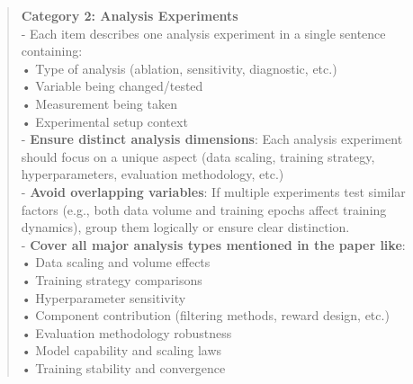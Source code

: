 \begin{quote}
\begin{tcolorbox}[breakable,colback=extraction!20!white, colframe=extraction!60!black, title=\textbf{Prompt for Extraction Agent}]
        \textbf{Category 2: Analysis Experiments}\\
        - Each item describes one analysis experiment in a single sentence containing:\\
        • Type of analysis (ablation, sensitivity, diagnostic, etc.)\\
        • Variable being changed/tested\\
        • Measurement being taken\\
        • Experimental setup context\\
        - \textbf{Ensure distinct analysis dimensions}: Each analysis experiment should focus on a unique aspect (data scaling, training strategy, hyperparameters, evaluation methodology, etc.)\\
        - \textbf{Avoid overlapping variables}: If multiple experiments test similar factors (e.g., both data volume and training epochs affect training dynamics), group them logically or ensure clear distinction.\\
        - \textbf{Cover all major analysis types mentioned in the paper like}:\\
        • Data scaling and volume effects\\
        • Training strategy comparisons\\
        • Hyperparameter sensitivity\\
        • Component contribution (filtering methods, reward design, etc.)\\
        • Evaluation methodology robustness\\
        • Model capability and scaling laws\\
        • Training stability and convergence\\
        

\end{tcolorbox}
\end{quote}
